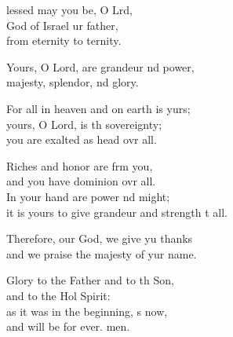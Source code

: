 \settowidth{\versewidth}{it is yours to give grandeur and strength to all.}
\begin{psalmverse}%
  \begin{patverse}
    lessed may you be, O Lrd,\Flex\\
God of Israel ur father,\Med\\
from eternity to ternity.

Yours, O Lord, are grandeur nd power,\Med\\
majesty, splendor, nd glory.

For all in heaven and on earth is yurs;\Flex\\
yours, O Lord, is th sovereignty;\Med\\
you are exalted as head ovr all.

Riches and honor are frm you,\Med\\
and you have dominion ovr all.\\
In your hand are power nd might;\Med\\
it is yours to give grandeur and strength t all.

Therefore, our God, we give yu thanks\Med\\
and we praise the majesty of yur name.

Glory to the Father and to th Son,\Med\\
    and to the Hol Spirit:\\
as it was in the beginning, \pointup{\i}s now,\Med\\
    and will be for ever. men.
  \end{patverse}
\end{psalmverse}
